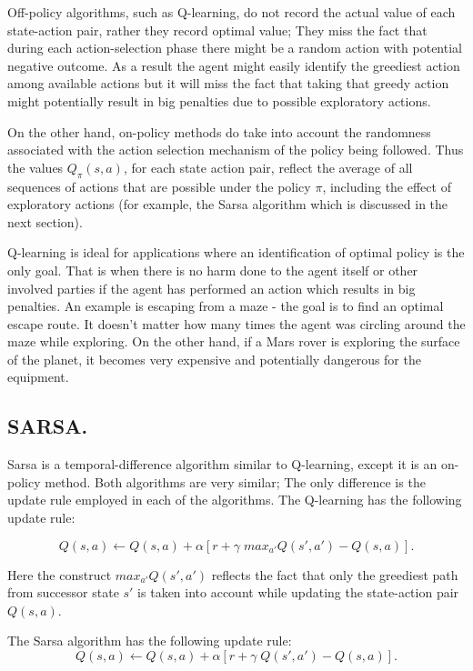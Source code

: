 Off-policy algorithms, such as Q-learning, do not record the actual value of each state-action pair, rather they record optimal value; They miss the fact that during each action-selection phase there might be a random action with potential negative outcome. As a result the agent might easily identify the greediest action among available actions but it will miss the fact that taking that greedy action might potentially result in big penalties due to possible exploratory actions.

On the other hand, on-policy methods do take into account the randomness associated with the action selection mechanism of the policy being followed. Thus the values $ Q_{\pi}(s,a) $, for each state action pair, reflect the average of all sequences of actions that are possible under the policy $ \pi $, including the effect of exploratory actions (for example, the Sarsa algorithm which is discussed in the next section).

Q-learning is ideal for applications where an identification of optimal policy is the only goal. That is when there is no harm done to the agent itself or other involved parties if the agent has performed an action which results in big penalties. An example is escaping from a maze - the goal is to find an optimal escape route. It doesn't matter how many times the agent was circling around the maze while exploring. On the other hand, if a Mars rover is exploring the surface of the planet, it becomes very expensive and potentially dangerous for the equipment.



\subsection{SARSA.}

Sarsa is a temporal-difference algorithm similar to Q-learning, except it is an on-policy method. Both algorithms are very similar; The only difference is the update rule employed in each of the algorithms. The Q-learning has the following update rule:

$$ Q(s,a) \leftarrow Q(s,a) + \alpha [r + \gamma\; max_{a'}Q(s',a') - Q(s,a)]. $$

Here the construct $ max_{a'}Q(s',a') $ reflects the fact that only the greediest path from successor state $ s' $ is taken into account while updating the state-action pair $ Q(s,a) $.

The Sarsa algorithm has the following update rule:
$$ Q(s,a) \leftarrow Q(s,a) + \alpha [r + \gamma\; Q(s',a') - Q(s,a)]. $$

